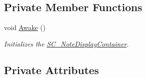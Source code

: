 \subsection*{Private Member Functions}
\begin{DoxyCompactItemize}
\item 
void \hyperlink{group___s_c___n_d_c_unity_ga6ce4069508f84edd9e13d8fab4c26e09}{Awake} ()
\begin{DoxyCompactList}\small\item\em Initializes the \hyperlink{class_s_c___note_display_container}{S\+C\+\_\+\+Note\+Display\+Container}. \end{DoxyCompactList}\end{DoxyCompactItemize}
\subsection*{Private Attributes}

